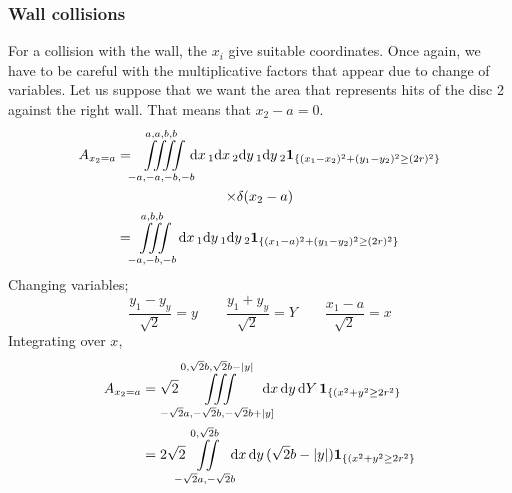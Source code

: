 \documentclass[superscriptaddress,pre,reprint,showpacs,twocolumn]{revtex4-1}
\newcommand{\rd}[1]{\mathrm{d}{#1} \,}
\newcommand{\indicatorsymbol}{\mathbf{1}}
\newcommand{\indicator}[1]{\indicatorsymbol_{ \{   #1 \} } }
\begin{document}
    \subsubsection{Wall collisions}

    For a collision with the wall, the $x_i$ give suitable coordinates. Once again, we
    have to be careful with the multiplicative factors that appear due to change
    of variables. Let us suppose that we want the area that represents hits of
    the disc 2 against the right wall. That means that $x_2-a=0$. 
    \begin{multline}
      A_{x_2=a}  =\iiiint \limits_{-a,-a,-b,-b}^{a,a,b,b}
       \mkern-9mu \rd x_1 \rd x_2 \rd y_1 \rd y_2 
       \indicator{(x_1-x_2)^2+(y_1-y_2)^2 \geq (2 r)^2}
       \\ \times \delta (x_2-a)\\
      =\iiint\limits _{-a,-b,-b}^{a,b,b} \rd x_1  \rd y_1 \rd y_2 
      \indicator{(x_1-a)^2+(y_1-y_2)^2 \geq (2 r)^2} 
    \end{multline}
    Changing variables;
    \begin{equation}
      \frac{y_1-y_y}{\sqrt{2}} =  y  \qquad \frac{y_1+y_y}{\sqrt{2}}=Y \qquad \frac{x_1-a}{\sqrt{2}}=x
    \end{equation}
    Integrating over $x$,
    \begin{align}\label{areachoquexy}
      A_{x_2=a} & =\sqrt{2} \mkern-18mu
      \iiint \limits
      _{-\sqrt{2}a,-\sqrt{2}b,-\sqrt{2}b+|y]}^{0,\sqrt{2}b,\sqrt{2}b-|y|}
        \mkern-18mu \rd x \rd y \rd Y 
        \indicator{(x^2+y^2 \geq 2 r^2}
        \\
        &=2\sqrt{2}\mkern-9mu
        \iint \limits_{-\sqrt{2}a,-\sqrt{2}b}^{0,\sqrt{2}b}
        \mkern-9mu
        \rd x \rd y (\sqrt{2} b - |y|)
      \indicator{(x^2+y^2 \geq 2 r^2}
    \end{align}
    
\end{document}
